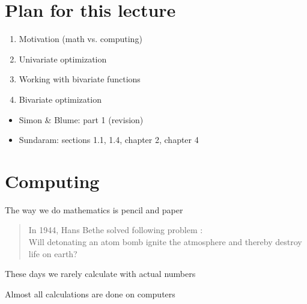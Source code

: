 \documentclass[letterpaper,10pt,english]{jupyterBook}
\begin{document}
\section{Plan for this lecture}
\label{\detokenize{02.optimization_intro:plan-for-this-lecture}}\begin{enumerate}
%
\item {} 
\sphinxAtStartPar
Motivation (math vs. computing)

\item {} 
\sphinxAtStartPar
Univariate optimization

\item {} 
\sphinxAtStartPar
Working with bivariate functions

\item {} 
\sphinxAtStartPar
Bivariate optimization

\end{enumerate}

\sphinxAtStartPar
{}
\begin{itemize}
\item {} 
\sphinxAtStartPar
Simon \& Blume: part 1 (revision)

\item {} 
\sphinxAtStartPar
Sundaram: sections 1.1, 1.4, chapter 2, chapter 4

\end{itemize}


\section{Computing}
\label{\detokenize{02.optimization_intro:computing}}
\sphinxAtStartPar
The  way we do mathematics is pencil and paper
\begin{quote}

\sphinxAtStartPar
In 1944, Hans Bethe solved following problem :\\
Will detonating an atom bomb ignite the atmosphere and
thereby destroy life on earth?\\
\end{quote}

\sphinxAtStartPar
These days we rarely calculate with actual numbers

\sphinxAtStartPar
Almost all calculations are done on computers
\end{document}
